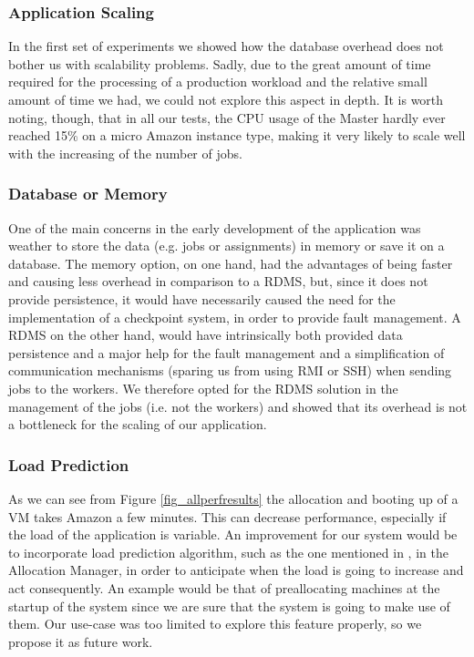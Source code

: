 \documentclass[a4paper]{IEEEtran}
\begin{document}
\subsubsection*{Application Scaling}

In the first set of experiments we showed how the database overhead does not bother us with scalability problems. Sadly, due to the great amount of time required for the processing of a production workload and the relative small amount of time we had, we could not explore this aspect in depth. It is worth noting, though, that in all our tests, the CPU usage of the Master hardly ever reached 15\% on a micro Amazon instance type, making it very likely to scale well with the increasing of the number of jobs.

\subsubsection*{Database or Memory}

One of the main concerns in the early development of the application was weather to store the data (e.g. jobs or assignments) in memory or save it on a database. The memory option, on one hand, had the advantages of being faster and causing less overhead in comparison to a RDMS, but, since it does not provide persistence, it would have necessarily caused the need for the implementation of a checkpoint system, in order to provide fault management. A RDMS on the other hand, would have intrinsically both provided data persistence and a major help for the fault management and a simplification of communication mechanisms (sparing us from using RMI or SSH) when sending jobs to the workers. We therefore opted for the RDMS solution in the management of the jobs (i.e. not the workers) and showed that its overhead is not a bottleneck for the scaling of our application.

\subsubsection*{Load Prediction}

As we can see from Figure \ref{fig_allperfresults} the allocation and booting up of a VM takes Amazon a few minutes. This can decrease performance, especially if the load of the application is variable. An improvement for our system would be to incorporate load prediction algorithm, such as the one mentioned in \cite{cloudscale}, in the Allocation Manager, in order to anticipate when the load is going to increase and act consequently. An example would be that of preallocating machines at the startup of the system since we are sure that the system is going to make use of them. Our use-case was too limited to explore this feature properly, so we propose it as future work.
\end{document}
